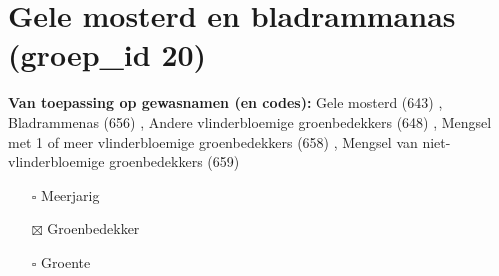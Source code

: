 \documentclass{article}
\begin{document}
 \section{Gele mosterd en bladrammanas (groep\_id 20)} 
 \textbf{Van toepassing op gewasnamen (en codes):} Gele mosterd (643) , Bladrammenas (656) , Andere vlinderbloemige groenbedekkers (648) , Mengsel met 1 of meer vlinderbloemige groenbedekkers (658) , Mengsel van niet-vlinderbloemige groenbedekkers (659) 
 \begin{multicols}{3} \begin{itemize} \item[$\square$] Meerjarig \item[$\boxtimes$] Groenbedekker \item[$\square$] Groente \end{itemize} \end{multicols} 
\end{document}
